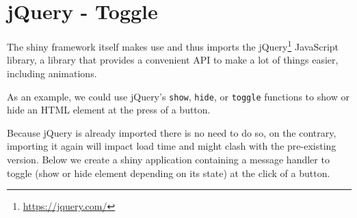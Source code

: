 \documentclass[
]{krantz}
\makeatletter
\newenvironment{Shaded}{\begin{snugshade}}{\end{snugshade}}
\newcommand{\AttributeTok}[1]{\textcolor[rgb]{0.61,0.61,0.61}{#1}}
\newcommand{\CommentTok}[1]{\textcolor[rgb]{0.37,0.37,0.37}{\textit{#1}}}
\newcommand{\ControlFlowTok}[1]{\textcolor[rgb]{0.27,0.27,0.27}{\textbf{#1}}}
\newcommand{\DataTypeTok}[1]{\textcolor[rgb]{0.27,0.27,0.27}{#1}}
\newcommand{\KeywordTok}[1]{\textcolor[rgb]{0.27,0.27,0.27}{\textbf{#1}}}
\newcommand{\NormalTok}[1]{#1}
\newcommand{\OperatorTok}[1]{\textcolor[rgb]{0.43,0.43,0.43}{\textbf{#1}}}
\newcommand{\StringTok}[1]{\textcolor[rgb]{0.5,0.5,0.5}{#1}}
\renewcommand{\href}[2]{#2\footnote{\url{#1}}}
\newenvironment{kframe}{%
\medskip{}
\setlength{\fboxsep}{.8em}
 \def\at@end@of@kframe{}%
 \ifinner\ifhmode%
  \def\at@end@of@kframe{\end{minipage}}%
  \begin{minipage}{\columnwidth}%
 \fi\fi%
 \def\FrameCommand##1{\hskip\@totalleftmargin \hskip-\fboxsep
 \colorbox{shadecolor}{##1}\hskip-\fboxsep
     \hskip-\linewidth \hskip-\@totalleftmargin \hskip\columnwidth}%
 \MakeFramed {\advance\hsize-\width
   \@totalleftmargin\z@ \linewidth\hsize
   \@setminipage}}%
 {\par\unskip\endMakeFramed%
 \at@end@of@kframe}
\renewenvironment{Shaded}{\begin{kframe}}{\end{kframe}}
\makeatother
\begin{document}
\hypertarget{jquery---toggle}{%
\section{jQuery - Toggle}\label{jquery---toggle}}

The shiny framework itself makes use and thus imports the \href{https://jquery.com/}{jQuery} JavaScript library, a library that provides a convenient API to make a lot of things easier, including animations.

As an example, we could use jQuery's \texttt{show}, \texttt{hide}, or \texttt{toggle} functions to show or hide an HTML element at the press of a button.

\begin{Shaded}
\end{Shaded}

Because jQuery is already imported there is no need to do so, on the contrary, importing it again will impact load time and might clash with the pre-existing version. Below we create a shiny application containing a message handler to toggle (show or hide element depending on its state) at the click of a button.

\begin{Shaded}
\end{Shaded}
\end{document}
